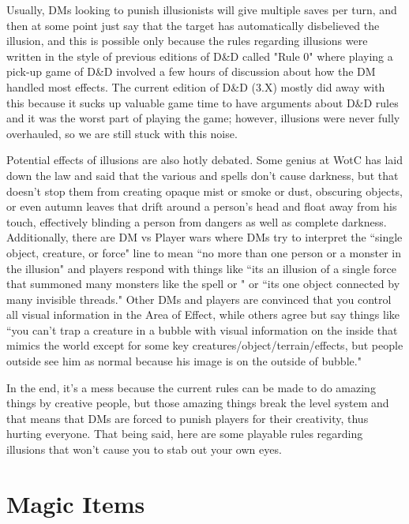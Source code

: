 Usually, DMs looking to punish illusionists will give multiple saves per turn, and then at some point just say that the target has automatically disbelieved the illusion, and this is possible only because the rules regarding illusions were written in the style of previous editions of D\&D called "Rule 0" where playing a pick-up game of D\&D involved a few hours of discussion about how the DM handled most effects. The current edition of D\&D (3.X) mostly did away with this because it sucks up valuable game time to have arguments about D\&D rules and it was the worst part of playing the game; however, illusions were never fully overhauled, so we are still stuck with this noise.

Potential effects of illusions are also hotly debated. Some genius at WotC has laid down the law and said that the various  and  spells don't cause darkness, but that doesn't stop them from creating opaque mist or smoke or dust, obscuring objects, or even autumn leaves that drift around a person's head and float away from his touch, effectively blinding a person from dangers as well as complete darkness. Additionally, there are DM vs Player wars where DMs try to interpret the ``single object, creature, or force" line to mean ``no more than one person or a monster in the illusion" and players respond with things like ``its an illusion of a single force that summoned many monsters like the spell  or " or ``its one object connected by many invisible threads." Other DMs and players are convinced that you control all visual information in the Area of Effect, while others agree but say things like ``you can't trap a creature in a bubble with visual information on the inside that mimics the world except for some key creatures/object/terrain/effects, but people outside see him as normal because his image is on the outside of bubble."

In the end, it's a mess because the current rules can be made to do amazing things by creative people, but those amazing things break the level system and that means that DMs are forced to punish players for their creativity, thus hurting everyone. That being said, here are some playable rules regarding illusions that won't cause you to stab out your own eyes.

\section{Magic Items}
\vspace*{-8pt}

